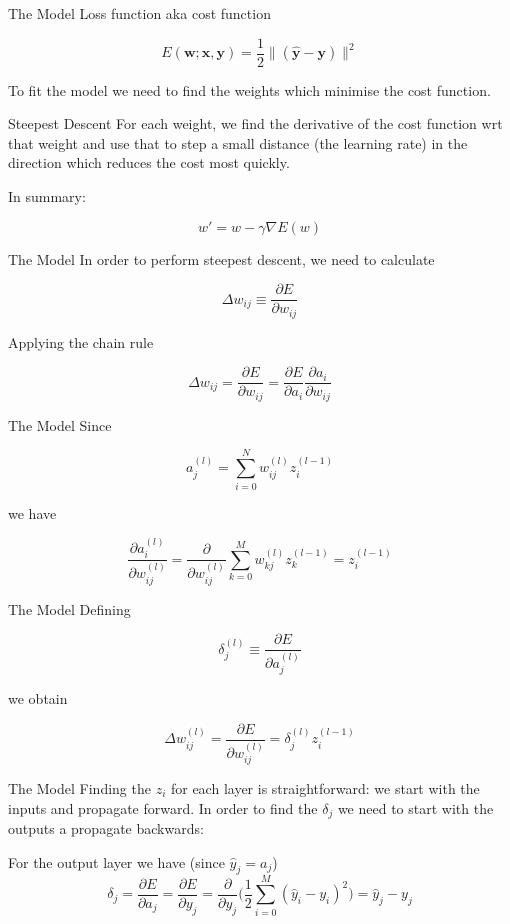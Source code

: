 \documentclass{beamer}
\begin{document}
\begin{frame}[fragile]{The Model}
Loss function aka cost function

$$
E(\boldsymbol{w}; \boldsymbol{x}, \boldsymbol{y}) = \frac{1}{2}\|(\hat{\boldsymbol{y}} - \boldsymbol{y})\|^2
$$

To fit the model we need to find the weights which minimise the cost
function.
\end{frame}

\begin{frame}[fragile]{Steepest Descent}
For each weight, we find the derivative of the cost function wrt that
weight and use that to step a small distance (the learning rate) in
the direction which reduces the cost most quickly.

In summary:

$$
w' = w - \gamma\nabla E(w)
$$
\end{frame}

\begin{frame}[fragile]{The Model}
In order to perform steepest descent, we need to calculate

$$
\Delta w_{ij} \equiv \frac{\partial E}{\partial w_{ij}}
$$

Applying the chain rule

$$
\Delta w_{ij} =
\frac{\partial E}{\partial w_{ij}} =
\frac{\partial E}{\partial a_i}\frac{\partial a_i}{\partial w_{ij}}
$$
\end{frame}

\begin{frame}[fragile]{The Model}
Since

$$
a_j^{(l)} = \sum_{i=0}^N w_{ij}^{(l)}z_i^{(l-1)}
$$

we have

$$
\frac{\partial a_i^{(l)}}{\partial w_{ij}^{(l)}} =
\frac{\partial}{\partial w_{ij}^{(l)}}\sum_{k=0}^M w_{kj}^{(l)}z_k^{(l-1)} =
z_i^{(l-1)}
$$
\end{frame}

\begin{frame}[fragile]{The Model}
Defining

$$
\delta_j^{(l)} \equiv
\frac{\partial E}{\partial a_j^{(l)}}
$$

we obtain

$$
\Delta w_{ij}^{(l)} =
\frac{\partial E}{\partial w_{ij}^{(l)}} =
\delta_j^{(l)} z_i^{(l-1)}
$$
\end{frame}

\begin{frame}[fragile]{The Model}
Finding the $z_i$ for each layer is straightforward: we start with the
inputs and propagate forward. In order to find the $\delta_j$ we need
to start with the outputs a propagate backwards:

For the output layer we have (since $\hat{y}_j = a_j$)
$$
\delta_j = \frac{\partial E}{\partial a_j} = \frac{\partial E}{\partial y_j} = \frac{\partial}{\partial y_j}\bigg(\frac{1}{2}\sum_{i=0}^M (\hat{y}_i - y_i)^2\bigg) = \hat{y}_j - y_j
$$
\end{frame}
\end{document}
